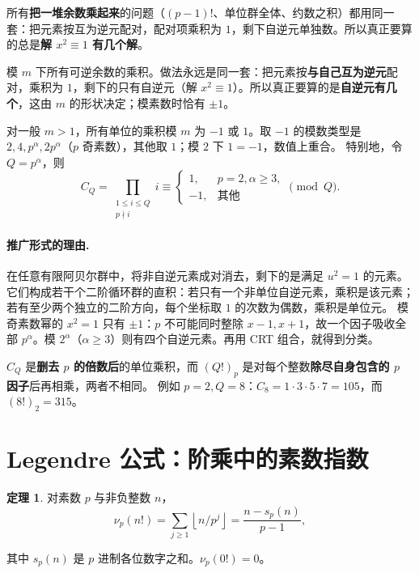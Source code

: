 \documentclass[UTF8,a4paper,11pt,twoside,openright,fontset=fandol]{ctexbook}
\theoremstyle{definition}
\newtheorem{theorem}[definition]{定理}
\newcommand{\floor}[1]{\left\lfloor #1\right\rfloor}
\begin{document}
\begin{tip}[一节里其实在算什么乘积]
所有\textbf{把一堆余数乘起来}的问题（$(p-1)!$、单位群全体、约数之积）都用同一套：把元素按互为逆元配对，配对项乘积为 $1$，剩下自逆元单独数。所以真正要算的总是\textbf{解 $x^2\equiv1$ 有几个解}。
\end{tip}


\begin{tip}
模 $m$ 下所有可逆余数的乘积。做法永远是同一套：把元素按\textbf{与自己互为逆元}配对，乘积为 $1$，剩下的只有自逆元（解 $x^2\equiv1$）。所以真正要算的是\textbf{自逆元有几个}，这由 $m$ 的形状决定；模素数时恰有 $\pm1$。
\end{tip}

对一般 $m>1$，所有单位的乘积模 $m$ 为 $-1$ 或 $1$。取 $-1$ 的模数类型是 $2,4,p^\alpha,2p^\alpha$（$p$ 奇素数），其他取 $1$；模 $2$ 下 $1=-1$，数值上重合。
特别地，令 $Q=p^\alpha$，则
\[
 C_Q=\prod_{\substack{1\le i\le Q\\p\nmid i}}i\equiv
 \begin{cases}1,&p=2,\alpha\ge3,\\-1,&\text{其他}\end{cases}\pmod Q.
\]


\paragraph{推广形式的理由.}
在任意有限阿贝尔群中，将非自逆元素成对消去，剩下的是满足 $u^2=1$ 的元素。它们构成若干个二阶循环群的直积：若只有一个非单位自逆元素，乘积是该元素；若有至少两个独立的二阶方向，每个坐标取 $1$ 的次数为偶数，乘积是单位元。
模奇素数幂的 $x^2=1$ 只有 $\pm1$：$p$ 不可能同时整除 $x-1,x+1$，故一个因子吸收全部 $p^\alpha$。模 $2^\alpha$（$\alpha\ge3$）则有四个自逆元素。再用 CRT 组合，就得到分类。
\begin{pitfall}
$C_Q$ 是\textbf{删去 $p$ 的倍数后}的单位乘积，而 $(Q!)_p$ 是对每个整数\textbf{除尽自身包含的 $p$ 因子}后再相乘，两者不相同。
例如 $p=2,Q=8$：$C_8=1\cdot3\cdot5\cdot7=105$，而 $(8!)_2=315$。
\end{pitfall}


\section{Legendre 公式：阶乘中的素数指数}
\begin{theorem}
对素数 $p$ 与非负整数 $n$，
\[
 \nu_p(n!)=\sum_{j\ge1}\floor{n/p^j}
 =\frac{n-s_p(n)}{p-1},
\]


其中 $s_p(n)$ 是 $p$ 进制各位数字之和。$\nu_p(0!)=0$。
\end{theorem}
\end{document}
